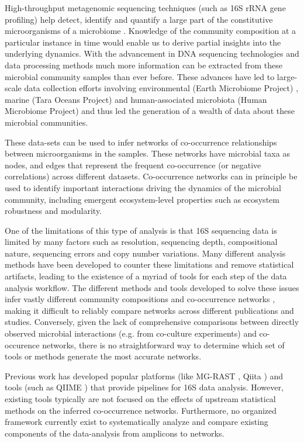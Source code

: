   High-throughput metagenomic sequencing techniques (such as 16S rRNA gene profiling) help detect, identify and quantify a large part of the constitutive microorganisms of a microbiome \cite{Jovel2016}.
  Knowledge of the community composition at a particular instance in time would enable us to derive partial insights into the underlying dynamics.
  With the advancement in DNA sequencing technologies \cite{Narihiro2017} and data processing methods much more information can be extracted from these microbial community samples than ever before.
  These advances have led to large-scale data collection efforts involving environmental (Earth Microbiome Project) \cite{Thompson2017}, marine (Tara Oceans Project) \cite{Zhang2015} and human-associated microbiota (Human Microbiome Project) \cite{HumanMicrobiomeProjectConsortium2012} and thus led the generation of a wealth of data about these microbial communities.
  
  These data-sets can be used to infer networks of co-occurrence relationships between microorganisms in the samples.
  These networks have microbial taxa as nodes, and edges that represent the frequent co-occurrence (or negative correlations) across different datasets.
  Co-occurrence networks can in principle be used to identify important interactions driving the dynamics of the microbial community, including emergent ecosystem-level properties such as ecosystem robustness and modularity.

  One of the limitations of this type of analysis is that 16S sequencing data is limited by many factors such as resolution, sequencing depth, compositional nature, sequencing errors and copy number variations.
  Many different analysis methods have been developed \cite{Callahan2016,Amir2017,Friedman2012,Kurtz2015} to counter these limitations and remove statistical artifacts, leading to the existence of a myriad of tools for each step of the data analysis workflow.
  The different methods and tools developed to solve these issues infer vastly different community compositions and co-occurrence networks \cite{Golob2017,Weiss2016}, making it difficult to reliably compare networks across different publications and studies.
  Conversely, given the lack of comprehensive comparisons between directly observed microbial interactions (e.g. from co-culture experiments) and co-occurence networks, there is no straightforward way to determine which set of tools or methods generate the most accurate networks.
  
 Previous work has developed popular platforms (like MG-RAST \cite{Keegan2016}, Qiita \cite{qiita}) and tools (such as QIIME \cite{Caporaso2010}) that provide pipelines for 16S data analysis. However, existing tools typically are not focused on the effects of upstream statistical methods on the inferred co-occurrence networks. Furthermore, no organized framework currently exist to systematically analyze and compare existing components of the data-analysis from amplicons to networks.
  
